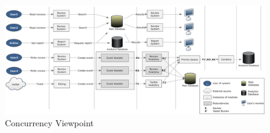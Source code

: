 \newpage
\begin{landscape}
\begin{figure}
\includegraphics[width=600px]{ConcurrencyViewpoint.jpg}
\caption{Concurrency Viewpoint}
\label{fig:concurrency}
\end{figure}
\end{landscape}